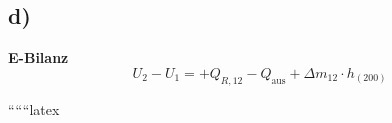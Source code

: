 

\subsection*{d)}
\textbf{E-Bilanz}
\begin{equation*}
    U_2 - U_1 = + Q_{R,12} - Q_{\text{aus}} + \Delta m_{12} \cdot h_{(200)}
\end{equation*}

``````latex